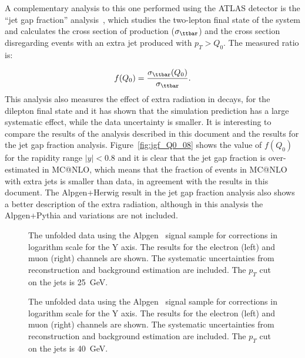 A complementary analysis to this one performed using the ATLAS detector is the ``jet gap fraction'' analysis~\cite{gapfraction}, which studies the
two-lepton final state of the \ttbar system and calculates the cross section of \ttbar production ($\sigma_{\ttbar}$) and the cross section disregarding
events with an extra jet produced with $p_T > Q_0$. The measured ratio is:

\begin{equation}
\displaystyle
f(Q_0) = \frac{\sigma_{\ttbar}(Q_0)}{\sigma_{\ttbar}}.
\label{eq:jgfq0}
\end{equation}
This analysis also measures the effect of extra radiation in \ttbar decays, for the dilepton final state and it has shown that the simulation prediction
has a large systematic effect, while the data uncertainty is smaller. It is interesting to compare the results of the analysis described in this document and
the results for the jet gap fraction analysis.
Figure~\ref{fig:jgf_Q0_08} shows the value of $f(Q_0)$ for the rapidity range $|y| < 0.8$ and it is clear that the jet gap fraction is over-estimated
in MC@NLO, which means that the fraction of events in MC@NLO with extra jets is smaller than data, in agreement with the results in this document.
The Alpgen+Herwig result in the jet gap fraction analysis also shows a better description of the extra radiation, although in this analysis the Alpgen+Pythia
and variations are not included.

\clearpage

\begin{sidewaysfigure}[htbp]
\centering
{}
\caption{The unfolded data using the Alpgen \ttbar\ signal sample for corrections in logarithm
  scale for the Y axis.  The results for
  the electron (left) and muon (right) channels are shown. The systematic
  uncertainties from reconstruction and background estimation are
  included. The $p_T$ cut on the jets is 25~GeV.}
\label{fig:MethodBunfoldedlog}
\end{sidewaysfigure}

\begin{sidewaysfigure}[htbp]
\centering
{}
\caption{The unfolded data using the Alpgen  \ttbar\ signal sample for corrections in logarithm
  scale for the Y axis.  The results for
  the electron (left) and muon (right) channels are shown. The systematic
  uncertainties from reconstruction and background estimation are
  included. The $p_T$ cut on the jets is 40~GeV. }
\label{fig:MethodBunfolded40log}
\end{sidewaysfigure}

